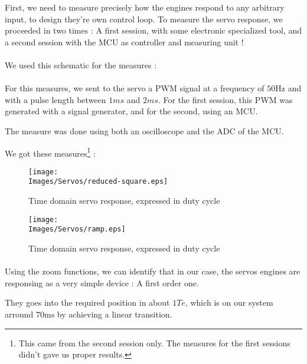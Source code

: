 First, we need to measure precisely how the engines respond to any arbitrary
input, to design they're own control loop. To measure the servo response, we
proceeded in two times : A first session, with some electronic specialized
tool, and a second session with the MCU as controller and measuring unit !

\paragraph{}
We used this schematic for the measures : 

\paragraph{}
For this measures, we sent to the servo a PWM signal at a frequency of $50
    \si{\hertz}$ and with a pulse length between $1 \si{ms}$ and $2 \si{ms}$. For
the first session, this PWM was generated with a signal generator, and for the
second, using an MCU.

The measure was done using both an oscilloscope and the ADC of the MCU.

We got these measures\footnote{ This came from the second session only. The
    measures for the first sessions didn't gave us proper results. } :

\begin{figure}[!hbt]
    \centering
    \begin{minipage}[c]{0.48\textwidth}
        \centering
        \texttt{[image: \\Images/Servos/reduced-square.eps]}
        \caption{Time domain servo response, expressed in duty cycle}\label{img:servo_square}
    \end{minipage}%
    \hfill%
    \begin{minipage}[c]{0.48\textwidth}
        \centering
        \texttt{[image: \\Images/Servos/ramp.eps]}
        \caption{Time domain servo response, expressed in duty cycle}\label{img:servo_ramp}
    \end{minipage}%
\end{figure}
\FloatBarrier

\paragraph{}
Using the zoom functions, we can identify that in our case, the servos engines
are responsing as a very simple device : A first order one.

They goes into the required position in about $1 Te$, which is on our system
arround $70 \si{\milli\second}$ by achieving a linear transition.

